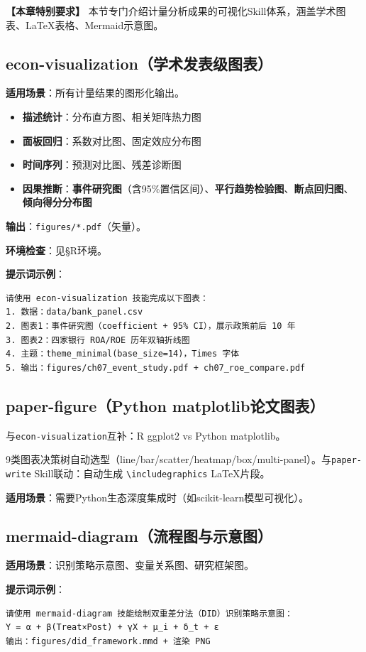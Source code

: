 \textbf{【本章特别要求】} 本节专门介绍计量分析成果的可视化Skill体系，涵盖学术图表、LaTeX表格、Mermaid示意图。

\subsection{econ-visualization（学术发表级图表）}
\textbf{适用场景}：所有计量结果的图形化输出。
\begin{itemize}[leftmargin=1em]
  \item \textbf{描述统计}：分布直方图、相关矩阵热力图
  \item \textbf{面板回归}：系数对比图、固定效应分布图
  \item \textbf{时间序列}：预测对比图、残差诊断图
  \item \textbf{因果推断}：\textbf{事件研究图}（含95\%置信区间）、\textbf{平行趋势检验图}、\textbf{断点回归图}、\textbf{倾向得分分布图}
\end{itemize}
\textbf{输出}：\texttt{figures/*.pdf}（矢量）。

\textbf{环境检查}：见§R环境。

\textbf{提示词示例}：
\begin{lstlisting}
请使用 econ-visualization 技能完成以下图表：
1. 数据：data/bank_panel.csv
2. 图表1：事件研究图（coefficient + 95% CI），展示政策前后 10 年
3. 图表2：四家银行 ROA/ROE 历年双轴折线图
4. 主题：theme_minimal(base_size=14)，Times 字体
5. 输出：figures/ch07_event_study.pdf + ch07_roe_compare.pdf
\end{lstlisting}

\subsection{paper-figure（Python matplotlib论文图表）}
与\texttt{econ-visualization}互补：R ggplot2 vs Python matplotlib。

9类图表决策树自动选型（line/bar/scatter/heatmap/box/multi-panel）。与\texttt{paper-write} Skill联动：自动生成 \texttt{\textbackslash includegraphics} LaTeX片段。

\textbf{适用场景}：需要Python生态深度集成时（如scikit-learn模型可视化）。

\subsection{mermaid-diagram（流程图与示意图）}
\textbf{适用场景}：识别策略示意图、变量关系图、研究框架图。

\textbf{提示词示例}：
\begin{lstlisting}
请使用 mermaid-diagram 技能绘制双重差分法（DID）识别策略示意图：
Y = α + β(Treat×Post) + γX + μ_i + δ_t + ε
输出：figures/did_framework.mmd + 渲染 PNG
\end{lstlisting}

